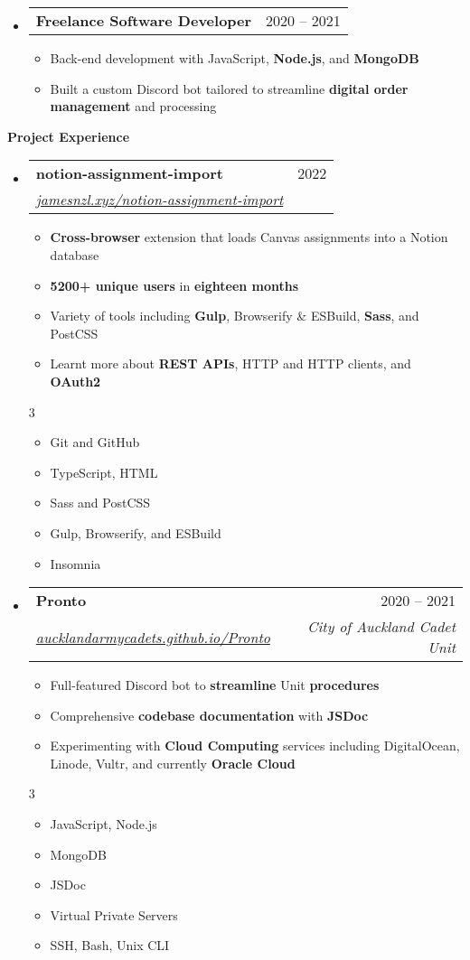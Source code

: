 \documentclass[11pt,a4paper]{article}[leftmargin=*]
\makeatletter
\def \entryspacing {-0pt}
\def \bulletstylei {\faAngleRight\hspace{-4.5pt}}
\def \bulletstyleii {\faCaretRight\hspace{-4.5pt}}
\renewcommand{\section}[2]{\vspace{5pt}
  \colorbox{secondary}{\color{white}\raggedbottom\normalsize\textbf{{#1}{\hspace{2pt}#2\hspace{4pt}}}}
}
\newcommand{\resumeEntryStart}{\begin{itemize}[leftmargin=2.5mm]}
\newcommand{\resumeEntryEnd}{\end{itemize}\vspace{\entryspacing}}
\newcommand{\resumeItemListStart}{\begin{itemize}[leftmargin=4.5mm]}
\newcommand{\resumeItemListEnd}{\end{itemize}}
\newcommand{\resumeItemListStartColumns}[2][-0.5]{\vspace*{#1\multicolsep}
\begin{multicols}{#2}\begin{itemize}[leftmargin=4.5mm]}
\newcommand{\resumeItemListEndColumns}[1][-1]{\end{itemize}\end{multicols}\vspace*{#1\multicolsep}}
\newcommand{\resumeItem}[2][\bulletstylei]{
  \item[\small#1]\small{
    {#2 \vspace{-2pt}}
  }
}
\newcommand{\resumeEntryTSDL}[4]{
  \vspace{-1pt}\item[]
    \begin{tabularx}{0.97\textwidth}{X@{\hspace{60pt}}r}
      \textbf{\color{primary}#1} & {\firabook\color{accent}\small#2} \\
      \textit{\color{accent}\small#3} & \textit{\color{accent}\small#4} \\
    \end{tabularx}\vspace{-6pt}
}
\newcommand{\resumeEntryTD}[2]{
  \vspace{-1pt}\item[]
    \begin{tabularx}{0.97\textwidth}{X@{\hspace{60pt}}r}
      \textbf{\color{primary}#1} & {\firabook\color{accent}\small#2} \\
    \end{tabularx}\vspace{-6pt}
}
\newcommand{\resumeBf}[1]{\small\textbf{\color{halfbold}#1}}
\makeatother
\begin{document}
\resumeEntryStart
\resumeEntryTD
{Freelance Software Developer}{2020 -- 2021}
\resumeItemListStart
\resumeItem {Back-end development with JavaScript, \resumeBf{Node.js}, and \resumeBf{MongoDB}}
\resumeItem {Built a custom Discord bot tailored to streamline \resumeBf{digital order management} and processing}
\resumeItemListEnd
\resumeEntryEnd

\pagebreak


\section{\faFlask}{Project Experience}

\resumeEntryStart
\resumeEntryTSDL
{notion-assignment-import}{2022}
{\href{https://jamesnzl.xyz/notion-assignment-import}{jamesnzl.xyz/notion-assignment-import}}{}
\resumeItemListStart
\resumeItem {\resumeBf{Cross-browser} extension that loads Canvas assignments into a Notion database}
\resumeItem {\resumeBf{5200+ unique users} in \resumeBf{eighteen months}}
\resumeItem {Variety of tools including \resumeBf{Gulp}, Browserify \& ESBuild, \resumeBf{Sass}, and PostCSS}
\resumeItem {Learnt more about \resumeBf{REST APIs}, HTTP and HTTP clients, and \resumeBf{OAuth2}}
\resumeItemListEnd
\resumeItemListStartColumns{3}
\resumeItem[\bulletstyleii] {Git and GitHub}
\resumeItem[\bulletstyleii] {TypeScript, HTML}
\resumeItem[\bulletstyleii] {Sass and PostCSS}
\resumeItem[\bulletstyleii] {Gulp, Browserify, and ESBuild}
\resumeItem[\bulletstyleii] {Insomnia}
\resumeItemListEndColumns
\resumeEntryEnd

\resumeEntryStart
\resumeEntryTSDL
{Pronto}{2020 -- 2021}
{\href{https://aucklandarmycadets.github.io/Pronto/}{aucklandarmycadets.github.io/Pronto}}{City of Auckland Cadet Unit}
\resumeItemListStart
\resumeItem {Full-featured Discord bot to \resumeBf{streamline} Unit \resumeBf{procedures}}
\resumeItem {Comprehensive \resumeBf{codebase documentation} with \resumeBf{JSDoc}}
\resumeItem {Experimenting with \resumeBf{Cloud Computing} services including DigitalOcean, Linode, Vultr, and currently \resumeBf{Oracle Cloud}}
\resumeItemListEnd
\resumeItemListStartColumns{3}
\resumeItem[\bulletstyleii] {JavaScript, Node.js}
\resumeItem[\bulletstyleii] {MongoDB}
\resumeItem[\bulletstyleii] {JSDoc}
\resumeItem[\bulletstyleii] {Virtual Private Servers}
\resumeItem[\bulletstyleii] {SSH, Bash, Unix CLI}
\resumeItemListEndColumns
\resumeEntryEnd
\end{document}
